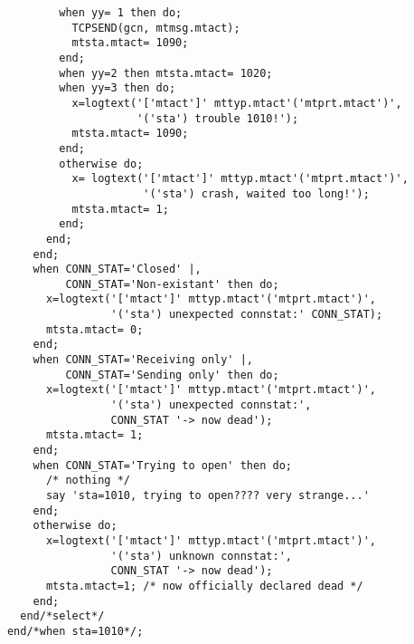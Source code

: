 \begin{verbatim}
              when yy= 1 then do;
                TCPSEND(gcn, mtmsg.mtact);
                mtsta.mtact= 1090;
              end;
              when yy=2 then mtsta.mtact= 1020;
              when yy=3 then do;
                x=logtext('['mtact']' mttyp.mtact'('mtprt.mtact')',
                          '('sta') trouble 1010!');
                mtsta.mtact= 1090;
              end;
              otherwise do;
                x= logtext('['mtact']' mttyp.mtact'('mtprt.mtact')',
                           '('sta') crash, waited too long!');
                mtsta.mtact= 1;
              end;
            end;
          end;
          when CONN_STAT='Closed' |,
               CONN_STAT='Non-existant' then do;
            x=logtext('['mtact']' mttyp.mtact'('mtprt.mtact')',
                      '('sta') unexpected connstat:' CONN_STAT);
            mtsta.mtact= 0;
          end;
          when CONN_STAT='Receiving only' |,
               CONN_STAT='Sending only' then do;
            x=logtext('['mtact']' mttyp.mtact'('mtprt.mtact')',
                      '('sta') unexpected connstat:',
                      CONN_STAT '-> now dead');
            mtsta.mtact= 1;
          end;
          when CONN_STAT='Trying to open' then do;
            /* nothing */
            say 'sta=1010, trying to open???? very strange...'
          end;
          otherwise do;
            x=logtext('['mtact']' mttyp.mtact'('mtprt.mtact')',
                      '('sta') unknown connstat:',
                      CONN_STAT '-> now dead');
            mtsta.mtact=1; /* now officially declared dead */
          end;
        end/*select*/
      end/*when sta=1010*/;


\end{verbatim}
